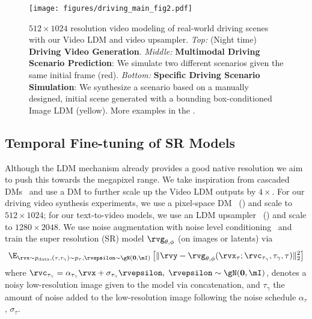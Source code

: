 \begin{figure*}[t!]
  \vspace{-0.8cm}
    \texttt{[image: figures/driving\_main\_fig2.pdf]}
    \vspace{-7mm}
    \caption{\small $512\times1024$ resolution video modeling of real-world driving scenes with our Video LDM and video upsampler. \emph{Top:} (Night time) \textbf{Driving Video Generation}. \emph{Middle:} \textbf{Multimodal Driving Scenario Prediction}: We simulate two different scenarios given the same initial frame (red). \emph{Bottom:} \textbf{Specific Driving Scenario Simulation}: We synthesize a scenario based on a manually designed, initial scene generated with a bounding box-conditioned Image LDM (yellow). More examples in the .  \vspace{-0.5em}}
    \label{fig:av_samples}
  \vspace{-4mm}
\end{figure*}\subsection{Temporal Fine-tuning of SR Models} \label{sec:method_upsampler}
Although the LDM mechanism already provides a good native resolution we aim to push this towards the megapixel range. We take inspiration from cascaded DMs~\cite{ho2021cascaded} and use a DM to further scale up the Video LDM outputs by $4\times$.
For our driving video synthesis experiments, we use a pixel-space DM~\cite{ho2021cascaded} () and scale to $512\times1024$; for our text-to-video models, we use an LDM upsampler~\cite{rombach2021highresolution} () and scale to $1280\times2048$.
We use noise augmentation with noise level conditioning~\cite{ho2021cascaded,saharia2022imagen} and train the super resolution (SR) model $\rvg_{\theta, \phi}$ (on images or latents) via
{\small\begin{align}
\E_{\rvx \sim p_{\text{data}}, (\tau,\tau_{\gamma}) \sim p_{\tau}, \rvepsilon \sim \gN(\mathbf{0}, \mI)} \left[\Vert \rvy - \rvg_{\theta, \phi}(\rvx_\tau; \rvc_{\tau_{\gamma}}, \tau_{\gamma}, \tau) \Vert_2^2 \right]
\label{eq:upscaleobjective}
\end{align}}
where $\rvc_{\tau_{\gamma}} = \alpha_{\tau_\gamma} \rvx + \sigma_{\tau_\gamma} \rvepsilon, \; \rvepsilon \sim \gN(\mathbf{0}, \mI)$, denotes a noisy low-resolution image given to the model via concatenation, and $\tau_\gamma$ the amount of noise added to the low-resolution image following the noise schedule $\alpha_\tau$, $\sigma_\tau$.

